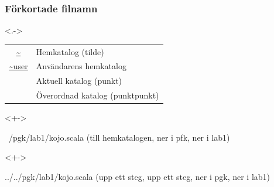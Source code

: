 



\begin{frame}[fragile,t]
    \frametitle{Förkortade filnamn}



    \blankline
    \begin{onlyenv}<.->
        \begin{tabular}{cl}
            \url{~}     & Hemkatalog (tilde) \\
            \url{~user} & Användarens hemkatalog \\
            \code{.}    & Aktuell katalog (punkt) \\
            \code{..}   & Överordnad katalog (punktpunkt) \\
        \end{tabular}
    \end{onlyenv}
    \blankline



    \begin{onlyenv}<+->
        \begin{GobbleCode}{10}
            ~/pgk/lab1/kojo.scala
            (till hemkatalogen, ner i pfk, ner i lab1)
        \end{GobbleCode}
    \end{onlyenv}
    \vspace{-1em}
    \begin{onlyenv}<+->
        \begin{GobbleCode}{10}
            ../../pgk/lab1/kojo.scala
            (upp ett steg, upp ett steg, ner i pgk, ner i lab1)
        \end{GobbleCode}
    \end{onlyenv}

\end{frame}


